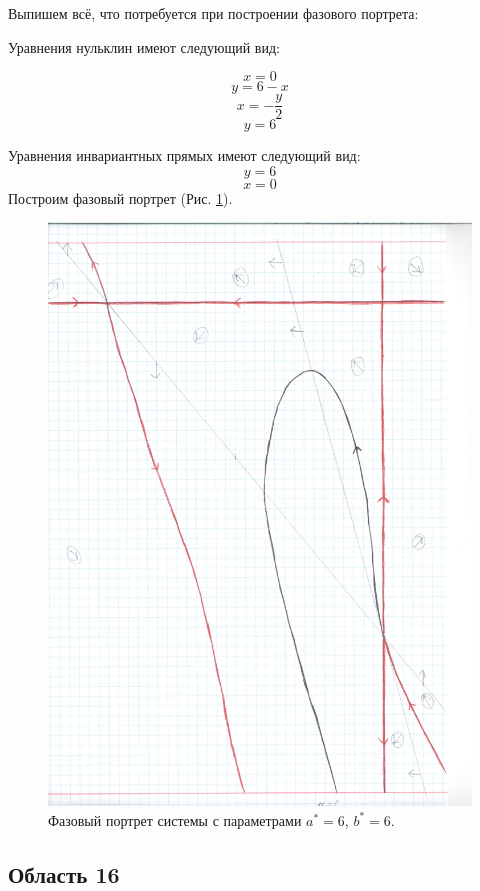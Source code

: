 Выпишем всё, что потребуется при построении фазового портрета:

Уравнения нульклин имеют следующий вид: 

$$x=0$$
$$y=6 - x$$
$$x=- \frac{y}{2}$$
$$y=6$$


Уравнения инвариантных прямых имеют следующий вид: 
$$y = 6$$
$$x = 0$$
Построим фазовый портрет (Рис. \ref{fig:phportr15}).

\begin{figure}[h]
	
	\includegraphics[width=\textwidth]{phptr/(6, 0).jpg}
	\centering
	\caption{\label{fig:phportr15} Фазовый портрет системы с параметрами $a^\ast = 6$, $b^\ast = 6$.}
	
\end{figure}

\subsection{Область 16}

